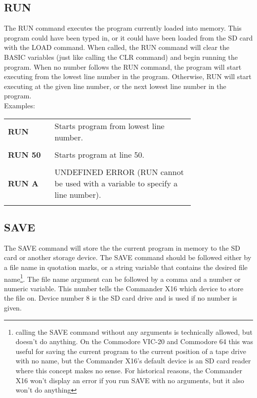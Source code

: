 \subsection{RUN}

The {\ttfamily RUN} command executes the program currently loaded into memory.
This program could have been typed in, or it could have been loaded from the SD
card with the {\ttfamily LOAD} command.  When called, the {\ttfamily RUN}
command will clear the BASIC variables (just like calling the {\ttfamily CLR}
command) and begin running the program.  When no number follows the {\ttfamily
RUN} command, the program will start executing from the lowest line number in
the program.  Otherwise, {\ttfamily RUN} will start executing at the given line
number, or the next lowest line number in the program.\\

Examples:\\

\begin{tabular}{l p{0.75\linewidth}}

	{\ttfamily\bfseries RUN}&Starts program from lowest line number.\\\\

	{\ttfamily\bfseries RUN 50}&Starts program at line 50.\\\\

	{\ttfamily\bfseries RUN A}&UNDEFINED ERROR ({\ttfamily RUN} cannot be used
	with a variable to specify a line number).\\\\

\end{tabular}

\subsection{SAVE}

The {\ttfamily SAVE} command will store the the current program in memory to
the SD card or another storage device.  The {\ttfamily SAVE} command should be
followed either by a file name in quotation marks, or a string variable that
contains the desired file name\footnote{calling the {\ttfamily SAVE} command
without any arguments is technically allowed, but doesn't do anything.  On the
Commodore VIC-20 and Commodore 64 this was useful for saving the current
program to the current position of a tape drive with no name, but the Commander
X16's default device is an SD card reader where this concept makes no sense.
For historical reasons, the Commander X16 won't display an error if you run
{\ttfamily SAVE} with no arguments, but it also won't do anything}.  The file
name argument can be followed by a comma and a number or numeric variable.
This number tells the Commander X16 which device to store the file on.  Device
number 8 is the SD card drive and is used if no number is given.\\


